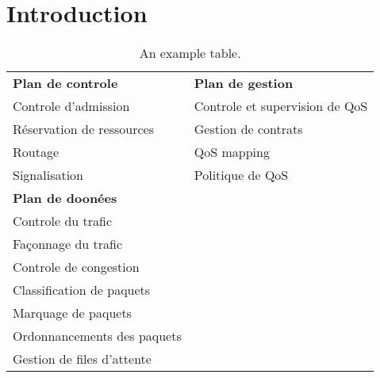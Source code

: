 \section{Introduction}












\begin{table}[h!]
\begin{center}
	\begin{tabulary}{\textwidth}{l|l}
	
	\textbf{Plan de controle}   & \textbf{Plan de gestion}      \\
	Controle d'admission        & Controle et supervision de QoS\\
	Réservation de ressources   & Gestion de contrats           \\
	Routage                     & QoS mapping                   \\
	Signalisation               & Politique de QoS              \\
	
	\textbf{Plan de doonées}    &                               \\
	Controle du trafic          &                               \\
	Façonnage du trafic         &                               \\
	Controle de congestion      &                               \\
	Classification de paquets   &                               \\
	Marquage de paquets         &                               \\
	Ordonnancements des paquets &                               \\
	Gestion de files d'attente  &                               \\

	\end{tabulary}
	\caption{\label{tab:qos} An example table.}
\end{center}
\end{table}
